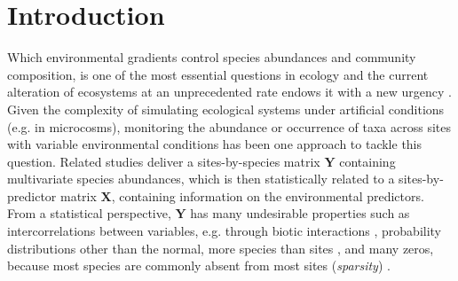 \section{Introduction}


	Which environmental gradients control species abundances and community composition, is one of the most essential questions in ecology \citep[e.g.][]{Clements1907}  and the current alteration of ecosystems at an unprecedented rate endows it with a new urgency \citep{pacifici2015assessing}. 
	Given the complexity of simulating ecological systems under artificial conditions (e.g. in microcosms), monitoring the abundance or occurrence of taxa across sites with variable  environmental conditions has been one approach to tackle this question.
	Related studies deliver a sites-by-species matrix $\mathbf{Y}$ containing multivariate species abundances, which is then statistically related to  a sites-by-predictor matrix $\mathbf{X}$, containing information on the environmental predictors.
	From a statistical perspective, $\mathbf{Y}$ has many undesirable properties such as
	intercorrelations between variables, 
	e.g. through biotic interactions \citep{morales2015inferring},
	probability distributions other than the normal, 
	more species than sites \citep[\textit{high dimensionality}, especially in DNA barcoding studies, ][]{cristescu2014barcoding},  
	and many zeros, because most species are commonly absent from most sites (\textit{sparsity}) \citep{mcgill2007species}. 
	
    
